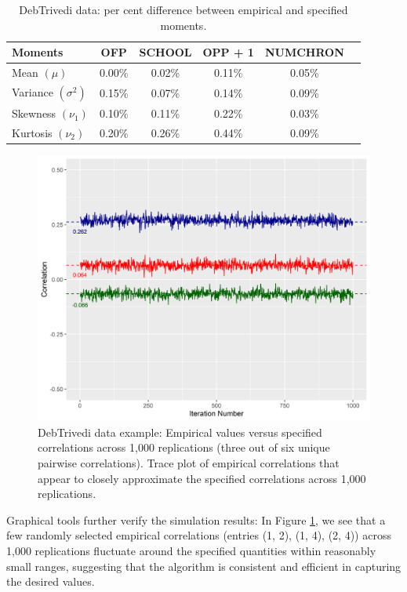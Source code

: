 \begin{table}[t]
\caption{DebTrivedi data: per cent difference between empirical and specified moments.} 
\centering 
\begin{tabularx}{0.75\linewidth}{lccccc} 
\toprule
Moments & OFP & SCHOOL & OPP + 1 & NUMCHRON \\ [0.5ex] 
\midrule
Mean $(\mu)$ & 0.00\% & 0.02\% & 0.11\% & 0.05\% \\
Variance $(\sigma^2)$ & 0.15\% &0.07\% &0.14\% &0.09\% \\
Skewness $(\nu_1)$ & 0.10\% & 0.11\% & 0.22\% & 0.03\% \\
Kurtosis $(\nu_2)$ & 0.20\% & 0.26\% & 0.44\% & 0.09\% \\
\bottomrule
\end{tabularx}
\label{t-3f} 
\end{table}

\begin{center}
\begin{figure}[H]
 \centering
 \includegraphics[width = \textwidth,height=0.8\textwidth,keepaspectratio]{DebTrivedi_alt.png}
\caption{DebTrivedi data example: Empirical values versus specified correlations across 1,000 replications (three out of six unique pairwise correlations). Trace plot of empirical correlations that appear to closely approximate the specified correlations across 1,000 replications.}
\label{f-2}
\end{figure}
\end{center}

Graphical tools further verify the simulation results: In Figure \ref{f-2}, we see that a few randomly selected empirical correlations (entries (1, 2), (1, 4), (2, 4)) across 1,000 replications fluctuate around the specified quantities within reasonably small ranges, suggesting that the algorithm is consistent and efficient in capturing the desired values.

